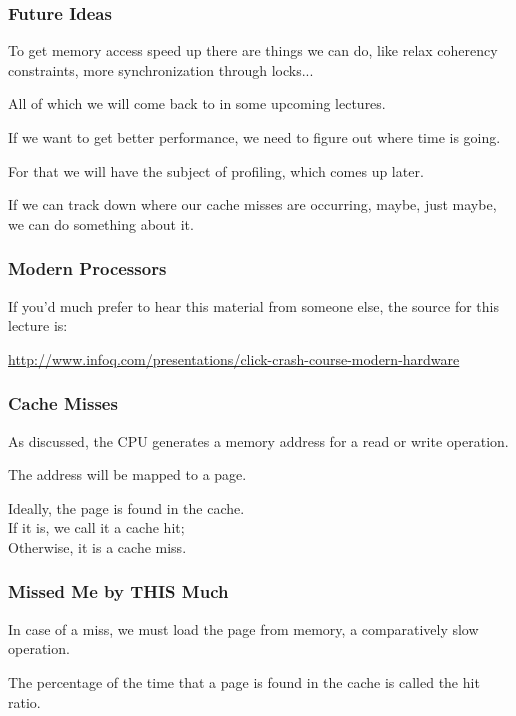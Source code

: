 \begin{frame}
\frametitle{Future Ideas}

To get memory access speed up there are things we can do, like relax coherency constraints, more synchronization through locks... 

All of which we will come back to in some upcoming lectures. 

If we want to get better performance, we need to figure out where time is going. 

For that we will have the subject of profiling, which comes up later.

If we can track down where our cache misses are occurring, maybe, just maybe, we can do something about it. 


\end{frame}


\begin{frame}
\frametitle{Modern Processors}

If you'd much prefer to hear this material from someone else, the source for this lecture is:

\begin{center}
\url{http://www.infoq.com/presentations/click-crash-course-modern-hardware}
\end{center}

\end{frame}

\begin{frame}
\frametitle{Cache Misses}

As discussed, the CPU generates a memory address for a read or write operation.

The address will be mapped to a page. 

Ideally, the page is found in the cache.\\
\quad If it is, we call it a \alert{cache hit};\\
\quad Otherwise, it is a \alert{cache miss}.

\end{frame}



\begin{frame}
\frametitle{Missed Me by THIS Much}

In case of a miss, we must load the page from memory, a comparatively slow operation.


The percentage of the time that a page is found in the cache is called the \alert{hit ratio}.

\end{frame}



